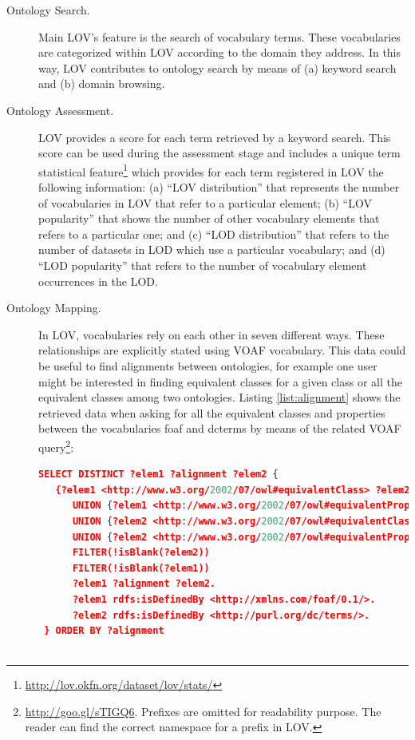 \documentclass{iosart2c}
\begin{document}
\begin{description}

 \item [Ontology Search.] Main LOV's feature is the search of vocabulary terms. These vocabularies are categorized within LOV according to the domain they address. In this way, LOV contributes to ontology search by means of (a) keyword search and (b) domain browsing.
 \item [Ontology Assessment.] LOV provides a score for each term retrieved by a keyword search. This score can be used during the assessment stage and includes a unique term statistical feature\footnote{\url{http://lov.okfn.org/dataset/lov/stats/}} which provides for each term registered in LOV the following information: (a) ``LOV distribution'' that represents the number of vocabularies in LOV that refer to a particular element; (b) ``LOV popularity'' that shows the number of other vocabulary elements that refers to a particular one; and (c) ``LOD distribution'' that refers to the number of datasets in LOD which use a particular vocabulary; and (d) ``LOD popularity'' that refers to the number of vocabulary element occurrences in the LOD.
 \item [Ontology Mapping.] In LOV, vocabularies rely on each other in seven different ways. These relationships are explicitly stated using VOAF vocabulary. This data could be useful to find alignments between ontologies, for example one user might be interested in finding equivalent classes for a given class or all the equivalent classes among two ontologies. Listing \ref{list:alignment} shows the retrieved data when asking for all the equivalent classes and properties between the vocabularies foaf and dcterms by means of the related VOAF query\footnote{\url{http://goo.gl/sTIGQ6}. Prefixes are omitted for readability purpose. The reader can find the correct namespace for a prefix in LOV.}:
     
 \begin{lstlisting}[basicstyle=\tiny,float=htb,caption={SPARQL query asking for all the equivalent classes and properties between the vocabularies foaf and dcterms. },label=list:alignment, language=json]
 SELECT DISTINCT ?elem1 ?alignment ?elem2 {
   {?elem1 <http://www.w3.org/2002/07/owl#equivalentClass> ?elem2}
      UNION {?elem1 <http://www.w3.org/2002/07/owl#equivalentProperty> ?elem2}
      UNION {?elem2 <http://www.w3.org/2002/07/owl#equivalentClass> ?elem1}
      UNION {?elem2 <http://www.w3.org/2002/07/owl#equivalentProperty> ?elem1}
      FILTER(!isBlank(?elem2))
      FILTER(!isBlank(?elem1))
      ?elem1 ?alignment ?elem2.
      ?elem1 rdfs:isDefinedBy <http://xmlns.com/foaf/0.1/>.
      ?elem2 rdfs:isDefinedBy <http://purl.org/dc/terms/>.
 } ORDER BY ?alignment
	

\end{lstlisting}
\end{description}
\end{document}

